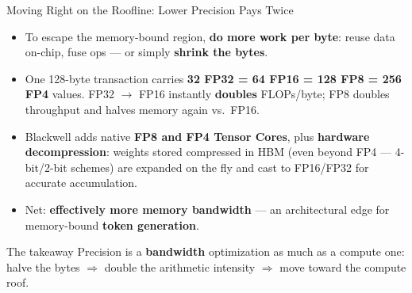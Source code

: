\documentclass[aspectratio=169]{beamer}
\newcommand{\kw}[1]{\textbf{\textcolor{kwblue}{#1}}}
\begin{document}
\begin{frame}{Moving Right on the Roofline: Lower Precision Pays Twice}
  \begin{itemize}
    \item To escape the memory-bound region, \kw{do more work per byte}: reuse data on-chip,
          fuse ops --- or simply \kw{shrink the bytes}.
    \item One 128-byte transaction carries \kw{32 FP32 = 64 FP16 = 128 FP8 = 256 FP4} values.
          FP32 $\to$ FP16 instantly \kw{doubles} FLOPs/byte; FP8 doubles throughput and halves
          memory again vs.\ FP16.
    \item Blackwell adds native \kw{FP8 and FP4 Tensor Cores}, plus \kw{hardware decompression}:
          weights stored compressed in HBM (even beyond FP4 --- 4-bit/2-bit schemes) are expanded
          on the fly and cast to FP16/FP32 for accurate accumulation.
    \item Net: \kw{effectively more memory bandwidth} --- an architectural edge for
          memory-bound \kw{token generation}.
  \end{itemize}
  \medskip
  \begin{block}{The takeaway}
    Precision is a \kw{bandwidth} optimization as much as a compute one:
    halve the bytes $\Rightarrow$ double the arithmetic intensity $\Rightarrow$ move toward the compute roof.
  \end{block}
\end{frame}
\end{document}

